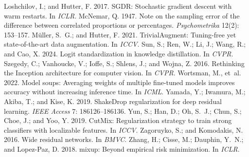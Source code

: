 \begin{thebibliography}{}
 Loshchilov, I.; and Hutter, F. 2017. SGDR: Stochastic gradient descent with warm restarts. In \emph{ICLR}.
 McNemar, Q. 1947. Note on the sampling error of the difference between correlated proportions or percentages. \emph{Psychometrika} 12(2): 153--157.
 M\"uller, S.~G.; and Hutter, F. 2021. TrivialAugment: Tuning-free yet state-of-the-art data augmentation. In \emph{ICCV}.
 Sun, S.; Ren, W.; Li, J.; Wang, R.; and Cao, X. 2024. Logit standardization in knowledge distillation. In \emph{CVPR}.
 Szegedy, C.; Vanhoucke, V.; Ioffe, S.; Shlens, J.; and Wojna, Z. 2016. Rethinking the Inception architecture for computer vision. In \emph{CVPR}.
 Wortsman, M., et~al. 2022. Model soups: Averaging weights of multiple fine-tuned models improves accuracy without increasing inference time. In \emph{ICML}.
 Yamada, Y.; Iwamura, M.; Akiba, T.; and Kise, K. 2019. ShakeDrop regularization for deep residual learning. \emph{IEEE Access} 7: 186126--186136.
 Yun, S.; Han, D.; Oh, S.~J.; Chun, S.; Choe, J.; and Yoo, Y. 2019. CutMix: Regularization strategy to train strong classifiers with localizable features. In \emph{ICCV}.
 Zagoruyko, S.; and Komodakis, N. 2016. Wide residual networks. In \emph{BMVC}.
 Zhang, H.; Cisse, M.; Dauphin, Y.~N.; and Lopez-Paz, D. 2018. mixup: Beyond empirical risk minimization. In \emph{ICLR}.
\end{thebibliography}

